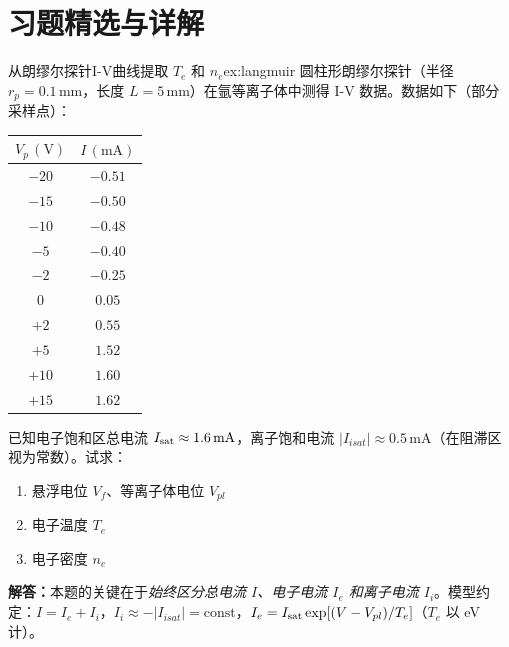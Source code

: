 

\section{习题精选与详解}

\begin{example}{从朗缪尔探针I-V曲线提取 $T_e$ 和 $n_e$}{ex:langmuir}
圆柱形朗缪尔探针（半径 $r_p=0.1\,\mathrm{mm}$，长度 $L=5\,\mathrm{mm}$）在氩等离子体中测得 I-V 数据。数据如下（部分采样点）：
\begin{center}
\begin{tabular}{c|c}
    $V_p\,\mathrm{(V)}$ & $I\,\mathrm{(mA)}$ \\
    \hline
    $-20$ & $-0.51$ \\
    $-15$ & $-0.50$ \\
    $-10$ & $-0.48$ \\
    $-5$  & $-0.40$ \\
    $-2$  & $-0.25$ \\
    $0$   & $0.05$  \\
    $+2$  & $0.55$  \\
    $+5$  & $1.52$  \\
    $+10$ & $1.60$  \\
    $+15$ & $1.62$  \\
\end{tabular}
\end{center}
已知电子饱和区总电流 $I_{\rm sat}\approx1.6\,\mathrm{mA}$，离子饱和电流 $|I_{isat}|\approx0.5\,\mathrm{mA}$（在阻滞区视为常数）。试求：
\begin{enumerate}
    \item 悬浮电位 $V_f$、等离子体电位 $V_{pl}$
    \item 电子温度 $T_e$
    \item 电子密度 $n_e$
\end{enumerate}
\end{example}

\textbf{解答：}本题的关键在于\emph{始终区分总电流 $I$、电子电流 $I_e$ 和离子电流 $I_i$}。模型约定：$I = I_e + I_i$，$I_i \approx -|I_{isat}| = \text{const}$，$I_e = I_{\rm sat}\exp[(V - V_{pl})/T_e]$（$T_e$ 以 eV 计）。

